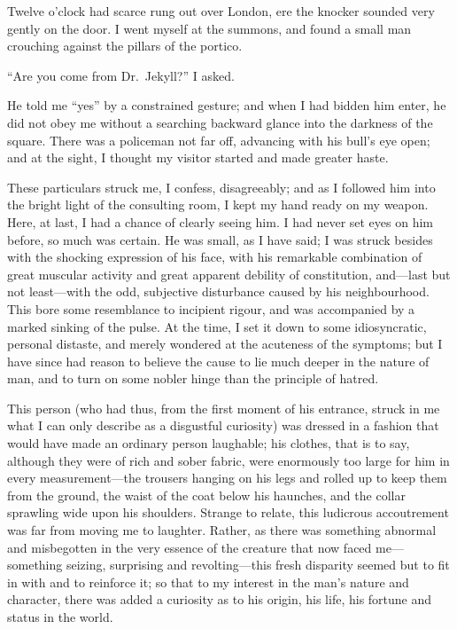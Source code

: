 \documentclass[12pt,openright]{book}
\begin{document}
Twelve o’clock had scarce rung out over London, ere the knocker sounded very gently on the door. I went myself at the summons, and found a small man crouching against the pillars of the portico.

“Are you come from Dr. Jekyll?” I asked.

He told me “yes” by a constrained gesture; and when I had bidden him enter, he did not obey me without a searching backward glance into the darkness of the square. There was a policeman not far off, advancing with his bull’s eye open; and at the sight, I thought my visitor started and made greater haste.

These particulars struck me, I confess, disagreeably; and as I followed him into the bright light of the consulting room, I kept my hand ready on my weapon. Here, at last, I had a chance of clearly seeing him. I had never set eyes on him before, so much was certain. He was small, as I have said; I was struck besides with the shocking expression of his face, with his remarkable combination of great muscular activity and great apparent debility of constitution, and—last but not least—with the odd, subjective disturbance caused by his neighbourhood. This bore some resemblance to incipient rigour, and was accompanied by a marked sinking of the pulse. At the time, I set it down to some idiosyncratic, personal distaste, and merely wondered at the acuteness of the symptoms; but I have since had reason to believe the cause to lie much deeper in the nature of man, and to turn on some nobler hinge than the principle of hatred.

This person (who had thus, from the first moment of his entrance, struck in me what I can only describe as a disgustful curiosity) was dressed in a fashion that would have made an ordinary person laughable; his clothes, that is to say, although they were of rich and sober fabric, were enormously too large for him in every measurement—the trousers hanging on his legs and rolled up to keep them from the ground, the waist of the coat below his haunches, and the collar sprawling wide upon his shoulders. Strange to relate, this ludicrous accoutrement was far from moving me to laughter. Rather, as there was something abnormal and misbegotten in the very essence of the creature that now faced me—something seizing, surprising and revolting—this fresh disparity seemed but to fit in with and to reinforce it; so that to my interest in the man’s nature and character, there was added a curiosity as to his origin, his life, his fortune and status in the world.
\end{document}
